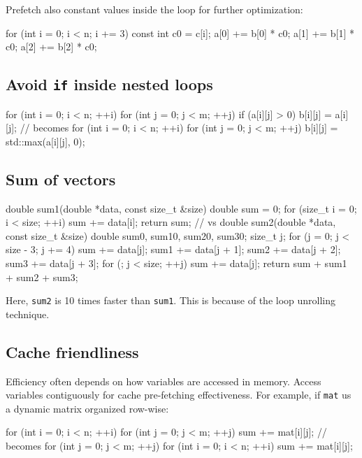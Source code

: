 Prefetch also constant values inside the loop for further optimization:
\begin{codeblock}[language=c++]
    for (int i = 0; i < n; i += 3) {
        const int c0 = c[i];
        a[0] += b[0] * c0;
        a[1] += b[1] * c0;
        a[2] += b[2] * c0;
    }
\end{codeblock}

\subsection*{Avoid \texttt{if} inside nested loops}

\begin{codeblock}[language=c++]
    for (int i = 0; i < n; ++i) {
        for (int j = 0; j < m; ++j) {
            if (a[i][j] > 0) {
                b[i][j] = a[i][j];
            }
        }
    }
    // becomes
    for (int i = 0; i < n; ++i) {
        for (int j = 0; j < m; ++j) {
            b[i][j] = std::max(a[i][j], 0);
        }
    }
\end{codeblock}

\subsection*{Sum of vectors}
\begin{codeblock}[language=c++]
    double sum1(double *data, const size_t &size) {
        double sum = 0;
        for (size_t i = 0; i < size; ++i) {
            sum += data[i];
        }
        return sum;
    }
    // vs 
    double sum2(double *data, const size_t &size) {
        double sum{0}, sum1{0}, sum2{0}, sum3{0};
        size_t j;
        for (j = 0; j < size - 3; j += 4) {
            sum += data[j];
            sum1 += data[j + 1];
            sum2 += data[j + 2];
            sum3 += data[j + 3];
        }
        for (; j < size; ++j) {
            sum += data[j];
        }
        return sum + sum1 + sum2 + sum3;
    }
\end{codeblock}

Here, \texttt{sum2} is 10 times faster than \texttt{sum1}. This is because of the loop unrolling technique.

\subsection*{Cache friendliness}
Efficiency often depends on how variables are accessed in memory. Access variables contiguously for cache pre-fetching effectiveness. For example, if \texttt{mat} us a dynamic matrix organized row-wise:
\begin{codeblock}[language=c++]
    for (int i = 0; i < n; ++i) {
        for (int j = 0; j < m; ++j) {
            sum += mat[i][j];
        }
    }
    // becomes
    for (int j = 0; j < m; ++j) {
        for (int i = 0; i < n; ++i) {
            sum += mat[i][j];
        }
    }
\end{codeblock}

